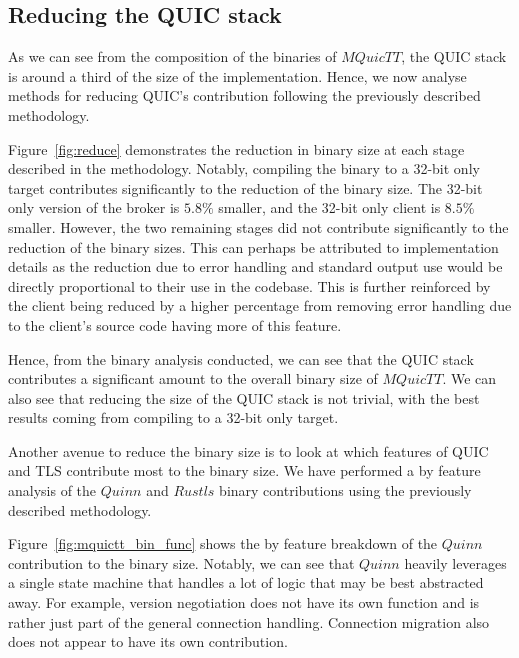 \subsection{Reducing the QUIC stack}

As we can see from the composition of the binaries of $MQuicTT$, the QUIC stack is around a third of the size of the implementation.
Hence, we now analyse methods for reducing QUIC's contribution following the previously described methodology.

Figure~\ref{fig:reduce} demonstrates the reduction in binary size at each stage described in the methodology.
Notably, compiling the binary to a 32-bit only target contributes significantly to the reduction of the binary size.
The 32-bit only version of the broker is $5.8\%$ smaller, and the 32-bit only client is $8.5\%$ smaller.
However, the two remaining stages did not contribute significantly to the reduction of the binary sizes.
This can perhaps be attributed to implementation details as the reduction due to error handling and standard output use would be directly proportional to their use in the codebase.
This is further reinforced by the client being reduced by a higher percentage from removing error handling due to the client's source code having more of this feature.

Hence, from the binary analysis conducted, we can see that the QUIC stack contributes a significant amount to the overall binary size of $MQuicTT$.
We can also see that reducing the size of the QUIC stack is not trivial, with the best results coming from compiling to a 32-bit only target.

Another avenue to reduce the binary size is to look at which features of QUIC and TLS contribute most to the binary size.
We have performed a by feature analysis of the $Quinn$ and $Rustls$ binary contributions using the previously described methodology.

Figure~\ref{fig:mquictt_bin_func} shows the by feature breakdown of the $Quinn$ contribution to the binary size.
Notably, we can see that $Quinn$ heavily leverages a single state machine that handles a lot of logic that may be best abstracted away.
For example, version negotiation does not have its own function and is rather just part of the general connection handling.
Connection migration also does not appear to have its own contribution.

